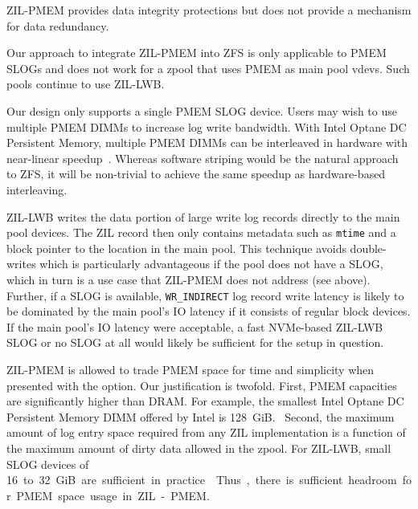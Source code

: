 \documentclass[12pt,a4paper,twoside]{book}
\begin{document}
ZIL-PMEM provides data integrity protections but does not provide a mechanism for data redundancy.

Our approach to integrate ZIL-PMEM into ZFS is only applicable to PMEM SLOGs and does not work for a zpool that uses PMEM as main pool vdevs.
Such pools continue to use ZIL-LWB.

Our design only supports a single PMEM SLOG device.
Users may wish to use multiple PMEM DIMMs to increase log write bandwidth.
With Intel Optane DC Persistent Memory, multiple PMEM DIMMs can be interleaved in hardware with near-linear speedup~\cite{yangEmpiricalGuideBehavior2020}.
Whereas software striping would be the natural approach to ZFS, it will be non-trivial to achieve the same speedup as hardware-based interleaving.

ZIL-LWB writes the data portion of large write log records directly to the main pool devices.
The ZIL record then only contains metadata such as \lstinline{mtime} and a block pointer to the location in the main pool.
This technique avoids double-writes which is particularly advantageous if the pool does not have a SLOG, which in turn is a use case that ZIL-PMEM does not address (see above).
Further, if a SLOG is available, \lstinline{WR_INDIRECT} log record write latency is likely to be dominated by the main pool's IO latency if it consists of regular block devices.
If the main pool's IO latency were acceptable, a fast NVMe-based ZIL-LWB SLOG or no SLOG at all would likely be sufficient for the setup in question.

ZIL-PMEM is allowed to trade PMEM space for time and simplicity when presented with the option.
Our justification is twofold.
First, PMEM capacities are significantly higher than DRAM.
For example, the smallest Intel Optane DC Persistent Memory DIMM offered by Intel is 128~GiB.~\cite{optanepricing_missing}
Second, the maximum amount of log entry space required from any ZIL implementation is a function of the maximum amount of dirty data allowed in the zpool.
For ZIL-LWB, small SLOG devices of \SI{16} to 32~GiB are sufficient in practice.
Thus, there is sufficient headroom for PMEM space usage in ZIL-PMEM.
\end{document}
